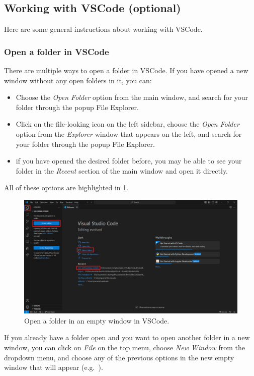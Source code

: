 \documentclass[a4paper,10pt]{article}
\begin{document}
\subsection{Working with VSCode (optional)}

Here are some general instructions about working with VSCode.

\subsubsection{Open a folder in VSCode}

There are multiple ways to open a folder in VSCode. If you have opened a new window without any open folders in it, you can:
\begin{itemize}
    \item Choose the \emph{Open Folder} option from the main window, and search for your folder through the popup File Explorer.
    \item Click on the file-looking icon on the left sidebar, choose the \emph{Open Folder} option from the \emph{Explorer} window that appears on the left, and search for your folder through the popup File Explorer.
    \item if you have opened the desired folder before, you may be able to see your folder in the \emph{Recent} section of the main window and open it directly.
\end{itemize}
All of these options are highlighted in \cref{fig:vscode_open_folder_1}.

\begin{figure}[htbp]
    \centering
    \includegraphics[width=\textwidth]{vscode_open_folder_1.png}
    \caption{Open a folder in an empty window in VSCode.}
    \label{fig:vscode_open_folder_1}   
\end{figure}

If you already have a folder open and you want to open another folder in a new window, you can click on \emph{File} on the top menu, choose \emph{New Window} from the dropdown menu, and choose any of the previous options in the new empty window that will appear (e.g.\ ).
\end{document}
